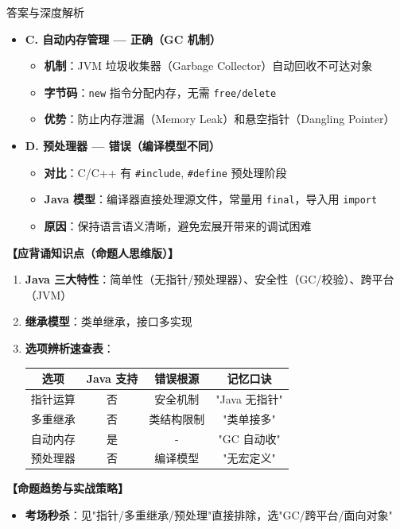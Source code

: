 \documentclass[12pt, a4paper]{ctexart}
\newcommand{\code}[1]{\texttt{#1}}
\begin{document}
\begin{enumerate}[label=\textbf{\arabic*.}, leftmargin=*, itemsep=1.5em]
\begin{bluebox}{答案与深度解析}
\begin{itemize}[leftmargin=*, nosep]
    \item \textbf{C. 自动内存管理 — 正确（GC 机制）}
    \begin{itemize}[leftmargin=*, nosep]
        \item \textbf{机制}：JVM 垃圾收集器（Garbage Collector）自动回收不可达对象
        \item \textbf{字节码}：\code{new} 指令分配内存，无需 \code{free/delete}
        \item \textbf{优势}：防止内存泄漏（Memory Leak）和悬空指针（Dangling Pointer）
    \end{itemize}
    
    \item \textbf{D. 预处理器 — 错误（编译模型不同）}
    \begin{itemize}[leftmargin=*, nosep]
        \item \textbf{对比}：C/C++ 有 \code{\#include}, \code{\#define} 预处理阶段
        \item \textbf{Java 模型}：编译器直接处理源文件，常量用 \code{final}，导入用 \code{import}
        \item \textbf{原因}：保持语言语义清晰，避免宏展开带来的调试困难
    \end{itemize}
\end{itemize}

\textbf{【应背诵知识点（命题人思维版）】}
\begin{enumerate}[leftmargin=*, nosep]
    \item \textbf{Java 三大特性}：简单性（无指针/预处理器）、安全性（GC/校验）、跨平台（JVM）
    \item \textbf{继承模型}：类单继承，接口多实现
    \item \textbf{选项辨析速查表}：
    \begin{tabular}{|c|c|c|c|}
        \hline
        \textbf{选项} & \textbf{Java 支持} & \textbf{错误根源} & \textbf{记忆口诀} \\
        \hline
        指针运算 & 否 & 安全机制 & "Java 无指针" \\
        \hline
        多重继承 & 否 & 类结构限制 & "类单接多" \\
        \hline
        自动内存 & 是 & - & "GC 自动收" \\
        \hline
        预处理器 & 否 & 编译模型 & "无宏定义" \\
        \hline
    \end{tabular}
\end{enumerate}

\textbf{【命题趋势与实战策略】}
\begin{itemize}[leftmargin=*, nosep]
    \item \textbf{考场秒杀}：见"指针/多重继承/预处理"直接排除，选"GC/跨平台/面向对象"
\end{itemize}
\end{bluebox}


\end{enumerate}
\end{document}
